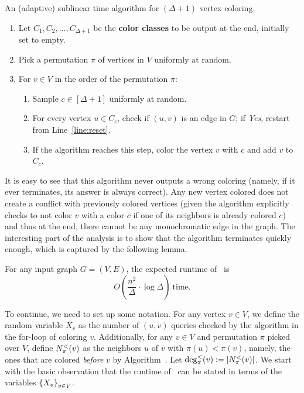 \begin{Algorithm}\label{alg:warmup}
	An (adaptive) sublinear time algorithm for $(\Delta+1)$ vertex coloring. 
	
	\begin{enumerate}
		\item Let $C_1,C_2,\ldots,C_{\Delta+1}$ be the \textbf{color classes} to be output at the end, initially set to empty. 
		\item Pick a permutation $\pi$ of vertices in $V$ uniformly at random.
		\item For $v \in V$ in the order of the permutation $\pi$: 
		\begin{enumerate}
			\item\label{line:reset} Sample $c \in [\Delta+1]$ uniformly at random. 
			\item For every vertex $u \in C_c$, check if $(u,v)$ is an edge in $G$; if \emph{Yes}, restart from Line~\eqref{line:reset}. 
			\item If the algorithm reaches this step, color the vertex $v$ with $c$ and add $v$ to $C_c$. 
		\end{enumerate}
	\end{enumerate}
	
\end{Algorithm}

It is easy to see that this algorithm never outputs a wrong coloring (namely, if it ever terminates, its answer is always correct). Any new vertex colored does not create a conflict with previously colored vertices (given the algorithm explicitly checks to not color $v$ with a color $c$ if one of its neighbors is already colored $c$) and thus at the end, there cannot be any monochromatic edge in the graph. The interesting part of the analysis is to show that the algorithm terminates quickly enough, which is captured by the following lemma. 

\begin{lemma}\label{lem:warmup-runtime}
	For any input graph $G=(V,E)$, the expected runtime of~ is 
	\[
	O(\frac{n^2}{\Delta} \cdot \log{\Delta}) ~\text{time}. 
	\] 
\end{lemma}

\noindent
To continue, we need to set up some notation.  For any vertex $v \in V$, we define the random variable $X_v$ as the number of $(u,v)$ queries checked by the algorithm in the for-loop of coloring $v$. Additionally, for any $v \in V$ and permutation $\pi$ picked over $V$, define $N^{<}_{\pi}(v)$ as the neighbors $u$ of $v$ with $\pi(u) < \pi(v)$, namely, the ones that are colored \emph{before} $v$ by Algorithm~. Let $\deg^{<}_{\pi}(v):= \left\vert{\ensuremath{N^{<}_{\pi}(v)}}\right\vert$. We start with the basic observation that the runtime of~ can be stated in terms of the variables $\left\{ X_v \right\}_{v \in V}$. 

